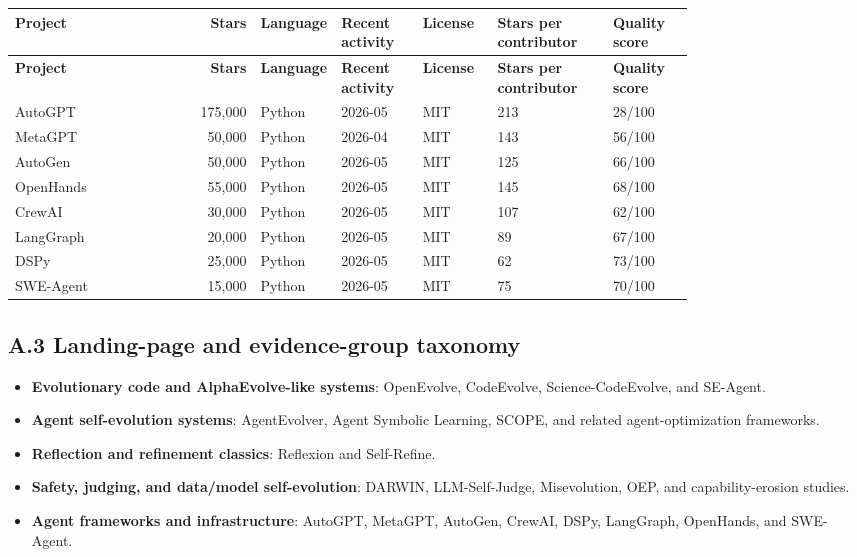 {\TableTight
\begin{longtable}{@{}L{0.16\linewidth}r L{0.11\linewidth}L{0.12\linewidth}L{0.11\linewidth}L{0.17\linewidth}L{0.12\linewidth}@{}}
\toprule
\textbf{Project} & \textbf{Stars} & \textbf{Language} & \textbf{Recent activity} & \textbf{License} & \textbf{Stars per contributor} & \textbf{Quality score} \\
\midrule
\endfirsthead
\toprule
\textbf{Project} & \textbf{Stars} & \textbf{Language} & \textbf{Recent activity} & \textbf{License} & \textbf{Stars per contributor} & \textbf{Quality score} \\
\midrule
\endhead
\bottomrule
\endlastfoot
AutoGPT & 175,000 & Python & 2026-05 & MIT & 213 & 28/100 \\
MetaGPT & 50,000 & Python & 2026-04 & MIT & 143 & 56/100 \\
AutoGen & 50,000 & Python & 2026-05 & MIT & 125 & 66/100 \\
OpenHands & 55,000 & Python & 2026-05 & MIT & 145 & 68/100 \\
CrewAI & 30,000 & Python & 2026-05 & MIT & 107 & 62/100 \\
LangGraph & 20,000 & Python & 2026-05 & MIT & 89 & 67/100 \\
DSPy & 25,000 & Python & 2026-05 & MIT & 62 & 73/100 \\
SWE-Agent & 15,000 & Python & 2026-05 & MIT & 75 & 70/100 \\
\end{longtable}}

\subsection*{A.3 Landing-page and evidence-group taxonomy}

\begin{itemize}
\item \textbf{Evolutionary code and AlphaEvolve-like systems}: OpenEvolve, CodeEvolve, Science-CodeEvolve, and SE-Agent.
\item \textbf{Agent self-evolution systems}: AgentEvolver, Agent Symbolic Learning, SCOPE, and related agent-optimization frameworks.
\item \textbf{Reflection and refinement classics}: Reflexion and Self-Refine.
\item \textbf{Safety, judging, and data/model self-evolution}: DARWIN, LLM-Self-Judge, Misevolution, OEP, and capability-erosion studies.
\item \textbf{Agent frameworks and infrastructure}: AutoGPT, MetaGPT, AutoGen, CrewAI, DSPy, LangGraph, OpenHands, and SWE-Agent.
\end{itemize}

